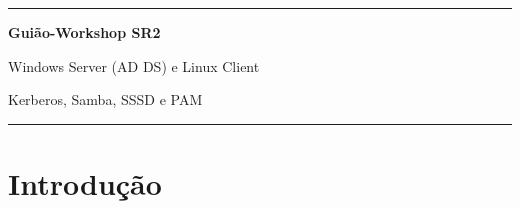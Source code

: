 \documentclass[11pt,a4paper,oneside]{report}
\begin{document}
\begin{titlepage}
  \centering
  \vspace*{\fill}
  {\color{azul}\rule{\linewidth}{1.2pt}\par}
  \vspace{1.5em}
  {\Huge\bfseries\color{azul} Guião-Workshop SR2\par}
  \vspace{1.2em}
  {\LARGE Windows Server (AD DS) e Linux Client\par}
  \vspace{0.5em}
  {\Large Kerberos, Samba, SSSD e PAM\par}
  \vspace{1.5em}
  {\color{azul}\rule{\linewidth}{1.2pt}\par}
  \vspace*{\fill}
\end{titlepage}

\pagestyle{plain}
\tableofcontents
\clearpage
{}
\pagestyle{fancy}

\chapter*{Introdução}
\end{document}
